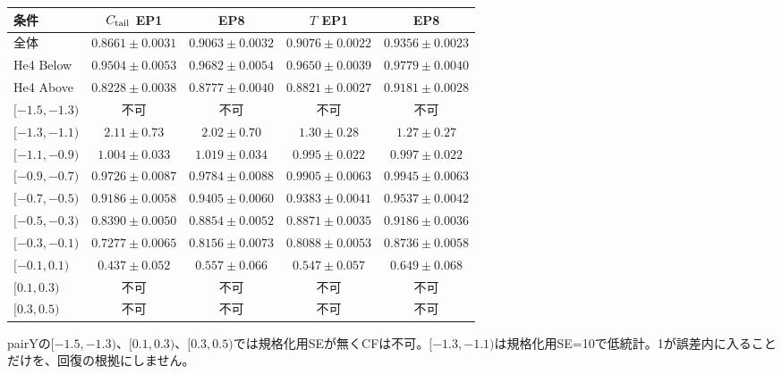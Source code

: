 \documentclass[11pt,a4paper]{article}
\newcommand{\boxnote}[1]{\par\colorbox{pale}{\parbox{\dimexpr\linewidth-5mm\relax}{\vspace{2mm}\small #1\vspace{2mm}}}\par}
\begin{document}
\begin{center}\small\begin{tabular}{P{4.1cm}cccc}\toprule

条件 & $C_{\rm tail}$ EP1 & EP8 & $T$ EP1 & EP8\\\midrule

全体 & $0.8661\pm0.0031$ & $0.9063\pm0.0032$ & $0.9076\pm0.0022$ & $0.9356\pm0.0023$\\

He4 Below & $0.9504\pm0.0053$ & $0.9682\pm0.0054$ & $0.9650\pm0.0039$ & $0.9779\pm0.0040$\\

He4 Above & $0.8228\pm0.0038$ & $0.8777\pm0.0040$ & $0.8821\pm0.0027$ & $0.9181\pm0.0028$\\

$[-1.5,-1.3)$ & 不可 & 不可 & 不可 & 不可\\

$[-1.3,-1.1)$ & $2.11\pm0.73$ & $2.02\pm0.70$ & $1.30\pm0.28$ & $1.27\pm0.27$\\

$[-1.1,-0.9)$ & $1.004\pm0.033$ & $1.019\pm0.034$ & $0.995\pm0.022$ & $0.997\pm0.022$\\

$[-0.9,-0.7)$ & $0.9726\pm0.0087$ & $0.9784\pm0.0088$ & $0.9905\pm0.0063$ & $0.9945\pm0.0063$\\

$[-0.7,-0.5)$ & $0.9186\pm0.0058$ & $0.9405\pm0.0060$ & $0.9383\pm0.0041$ & $0.9537\pm0.0042$\\

$[-0.5,-0.3)$ & $0.8390\pm0.0050$ & $0.8854\pm0.0052$ & $0.8871\pm0.0035$ & $0.9186\pm0.0036$\\

$[-0.3,-0.1)$ & $0.7277\pm0.0065$ & $0.8156\pm0.0073$ & $0.8088\pm0.0053$ & $0.8736\pm0.0058$\\

$[-0.1,0.1)$ & $0.437\pm0.052$ & $0.557\pm0.066$ & $0.547\pm0.057$ & $0.649\pm0.068$\\

$[0.1,0.3)$ & 不可 & 不可 & 不可 & 不可\\

$[0.3,0.5)$ & 不可 & 不可 & 不可 & 不可\\

\bottomrule\end{tabular}\end{center}

\boxnote{pairYの$[-1.5,-1.3)$、$[0.1,0.3)$、$[0.3,0.5)$では規格化用SEが無くCFは不可。$[-1.3,-1.1)$は規格化用SE=10で低統計。1が誤差内に入ることだけを、回復の根拠にしません。}
\end{document}
